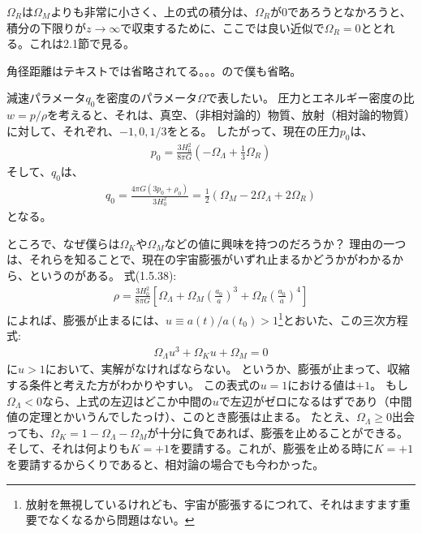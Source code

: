 \documentclass[11pt]{ltjsarticle}
\theoremstyle{plain}
\theoremstyle{break}
\begin{document}
$\Omega_{R}$は$\Omega_{M}$よりも非常に小さく、上の式の積分は、$\Omega_{R}$が$0$であろうとなかろうと、積分の下限りが$z \to \infty$で収束するために、ここでは良い近似で$\Omega_{R} = 0$ととれる。これは2.1節で見る。

角径距離はテキストでは省略されてる。。。ので僕も省略。

減速パラメータ$q_0$を密度のパラメータ$\Omega$で表したい。
圧力とエネルギー密度の比$w = p/\rho$を考えると、それは、真空、（非相対論的）物質、放射（相対論的物質）に対して、それぞれ、$-1,0,1/3$をとる。
したがって、現在の圧力$p_0$は、
\begin{align}
  p_{0}=\frac{3 H_{0}^{2}}{8 \pi G}\left(-\Omega_{\Lambda}+\frac{1}{3} \Omega_{R}\right)
\end{align}%
そして、$q_0$は、
\begin{align}
  q_{0}=\frac{4 \pi G\left(3 p_{0}+\rho_{0}\right)}{3 H_{0}^{2}}=\frac{1}{2}\left(\Omega_{M}-2 \Omega_{\Lambda}+2 \Omega_{R}\right)
\end{align}%
となる。

ところで、なぜ僕らは$\Omega_{K}$や$\Omega_{M}$などの値に興味を持つのだろうか？
理由の一つは、それらを知ることで、現在の宇宙膨張がいずれ止まるかどうかがわかるから、というのがある。
式(1.5.38):
\begin{align}
  \rho=\frac{3 H_{0}^{2}}{8 \pi G}\left[\Omega_{\Lambda}+\Omega_{M}\left(\frac{a_{0}}{a}\right)^{3}+\Omega_{R}\left(\frac{a_{0}}{a}\right)^{4}\right]
\end{align}%
によれば、膨張が止まるには、$u \equiv a(t) / a\left(t_{0}\right) >1 $\footnote{放射を無視しているけれども、宇宙が膨張するにつれて、それはますます重要でなくなるから問題はない。}とおいた、この三次方程式:
\begin{align}
  \Omega_{\Lambda} u^{3}+\Omega_{K} u+\Omega_{M}=0
\end{align}%
に$u>1$において、実解がなければならない。
というか、膨張が止まって、収縮する条件と考えた方がわかりやすい。
この表式の$u=1$における値は$+1$。
もし$\Omega_{\Lambda} < 0$なら、上式の左辺はどこか中間の$u$で左辺がゼロになるはずであり（中間値の定理とかいうんでしたっけ）、このとき膨張は止まる。
たとえ、$\Omega_{\Lambda} \geq 0$出会っても、$\Omega_{K}  = 1 - \Omega_{\Lambda} - \Omega_{M}$が十分に負であれば、膨張を止めることができる。
そして、それは何よりも$K=+1$を要請する。これが、膨張を止める時に$K=+1$を要請するからくりであると、相対論の場合でも今わかった。
\end{document}
